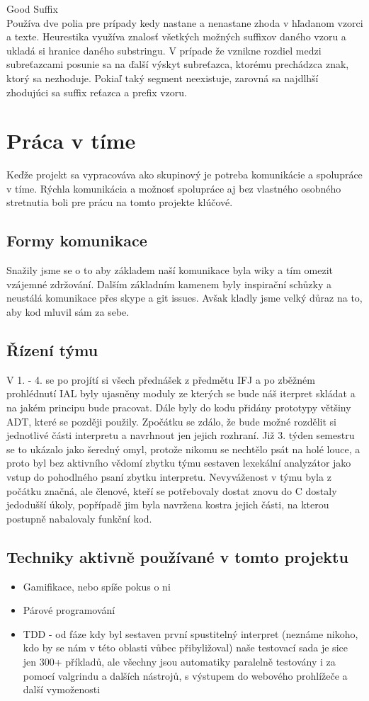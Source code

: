 \documentclass[a4paper]{article}
\begin{document}
Good Suffix\\
Používa dve polia pre prípady kedy nastane a nenastane zhoda v hľadanom vzorci a texte. Heurestika využíva znalosť všetkých možných suffixov daného vzoru a ukladá si hranice daného substringu. V prípade že vznikne rozdiel medzi subreťazcami posunie sa na ďalší výskyt subreťazca, ktorému prechádzca znak, ktorý sa nezhoduje. Pokiaľ taký segment neexistuje, zarovná sa najdlhší zhodujúci sa suffix reťazca a prefix vzoru.

\section{Práca v tíme}
Keďže projekt sa vypracováva ako skupinový je potreba komunikácie a spolupráce v tíme. Rýchla komunikácia a možnosť spolupráce aj bez vlastného osobného stretnutia boli pre prácu na tomto projekte klúčové.

\subsection{Formy komunikace}
Snažily jsme se o to aby základem naší komunikace byla wiky a tím omezit vzájemné zdržování. Dalším základním kamenem byly inspirační schůzky a neustálá komunikace přes skype a git issues. Avšak kladly jsme velký důraz na to, aby kod mluvil sám za sebe.

\subsection{Řízení týmu}
V 1. - 4. se po projítí si všech přednášek z předmětu IFJ a po zběžném prohlédnutí IAL byly ujasněny moduly ze kterých se bude náš iterpret skládat a na jakém principu bude pracovat. Dále byly do kodu přidány prototypy většiny ADT, které se později použily.
Zpočátku se zdálo, že bude možné rozdělit si jednotlivé části interpretu a navrhnout jen jejich rozhraní. Již 3. týden semestru se to ukázalo jako šeredný omyl, protože nikomu se nechtělo psát na holé louce, a proto byl bez aktivního vědomí zbytku týmu sestaven lexekální analyzátor jako vstup do pohodlného psaní zbytku interpretu. Nevyváženost v týmu byla z počátku značná, ale členové, kteří se potřebovaly dostat znovu do C dostaly jedodušší úkoly, popřípadě jim byla navržena kostra jejich části, na kterou postupně nabalovaly funkční kod.

\subsection{Techniky aktivně používané v tomto projektu}
\begin{itemize}
	\item Gamifikace, nebo spíše pokus o ni 
	\item Párové programování
	\item TDD - od fáze kdy byl sestaven první spustitelný interpret (neznáme nikoho, kdo by se nám v této oblasti vůbec přibyližoval) naše testovací sada je sice jen 300+ příkladů, ale všechny jsou automatiky paralelně testovány i za pomocí valgrindu a dalších nástrojů, s výstupem do webového prohlížeče a další vymoženosti
\end{itemize}
\end{document}
